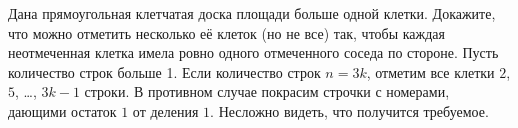\problem
Дана прямоугольная клетчатая доска площади больше одной клетки.
Докажите, что можно отметить несколько её клеток (но не все) так, чтобы каждая
неотмеченная клетка имела ровно одного отмеченного соседа по стороне.
\solution
Пусть количество строк больше 1.
Если количество строк $n = 3 k$, отметим все клетки
$2$, $5$, \ldots, $3 k - 1$ строки.
В противном случае покрасим строчки с номерами, дающими остаток $1$ от деления
$1$.
Несложно видеть, что получится требуемое.
\endproblem

